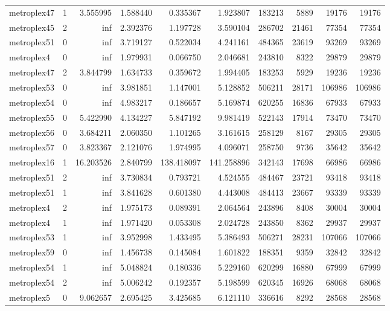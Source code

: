\documentclass[../../../thesis.tex]{subfiles}
\begin{document}
\begin{longtable}{|l|r|r|r|r|r|r|r|r|r|}
metroplex47 & 1 & 3.555995 & 1.588440 & 0.335367 & 1.923807 & 183213 & 5889 & 19176 & 19176 \\
metroplex45 & 2 & inf & 2.392376 & 1.197728 & 3.590104 & 286702 & 21461 & 77354 & 77354 \\
metroplex51 & 0 & inf & 3.719127 & 0.522034 & 4.241161 & 484365 & 23619 & 93269 & 93269 \\
metroplex4 & 0 & inf & 1.979931 & 0.066750 & 2.046681 & 243810 & 8322 & 29879 & 29879 \\
metroplex47 & 2 & 3.844799 & 1.634733 & 0.359672 & 1.994405 & 183253 & 5929 & 19236 & 19236 \\
metroplex53 & 0 & inf & 3.981851 & 1.147001 & 5.128852 & 506211 & 28171 & 106986 & 106986 \\
metroplex54 & 0 & inf & 4.983217 & 0.186657 & 5.169874 & 620255 & 16836 & 67933 & 67933 \\
metroplex55 & 0 & 5.422990 & 4.134227 & 5.847192 & 9.981419 & 522143 & 17914 & 73470 & 73470 \\
metroplex56 & 0 & 3.684211 & 2.060350 & 1.101265 & 3.161615 & 258129 & 8167 & 29305 & 29305 \\
metroplex57 & 0 & 3.823367 & 2.121076 & 1.974995 & 4.096071 & 258750 & 9736 & 35642 & 35642 \\
metroplex16 & 1 & 16.203526 & 2.840799 & 138.418097 & 141.258896 & 342143 & 17698 & 66986 & 66986 \\
metroplex51 & 2 & inf & 3.730834 & 0.793721 & 4.524555 & 484467 & 23721 & 93418 & 93418 \\
metroplex51 & 1 & inf & 3.841628 & 0.601380 & 4.443008 & 484413 & 23667 & 93339 & 93339 \\
metroplex4 & 2 & inf & 1.975173 & 0.089391 & 2.064564 & 243896 & 8408 & 30004 & 30004 \\
metroplex4 & 1 & inf & 1.971420 & 0.053308 & 2.024728 & 243850 & 8362 & 29937 & 29937 \\
metroplex53 & 1 & inf & 3.952998 & 1.433495 & 5.386493 & 506271 & 28231 & 107066 & 107066 \\
metroplex59 & 0 & inf & 1.456738 & 0.145084 & 1.601822 & 188351 & 9359 & 32842 & 32842 \\
metroplex54 & 1 & inf & 5.048824 & 0.180336 & 5.229160 & 620299 & 16880 & 67999 & 67999 \\
metroplex54 & 2 & inf & 5.006242 & 0.192357 & 5.198599 & 620345 & 16926 & 68068 & 68068 \\
metroplex5 & 0 & 9.062657 & 2.695425 & 3.425685 & 6.121110 & 336616 & 8292 & 28568 & 28568 \\

\end{longtable}
\end{document}
